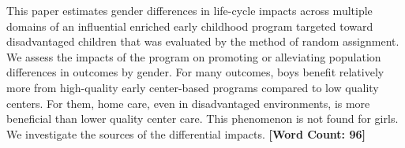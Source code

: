 \noindent This paper estimates gender differences in life-cycle impacts across multiple domains of an influential enriched early childhood program targeted toward disadvantaged children that was evaluated by the method of random assignment. We assess the impacts of the program on promoting or alleviating population differences in outcomes by gender. For many outcomes, boys benefit relatively more from high-quality early center-based programs compared to low quality centers. For them, home care, even in disadvantaged environments, is more beneficial than lower quality center care. This phenomenon is not found for girls. We investigate the sources of the differential impacts. \textbf{[Word Count: 96]} 
